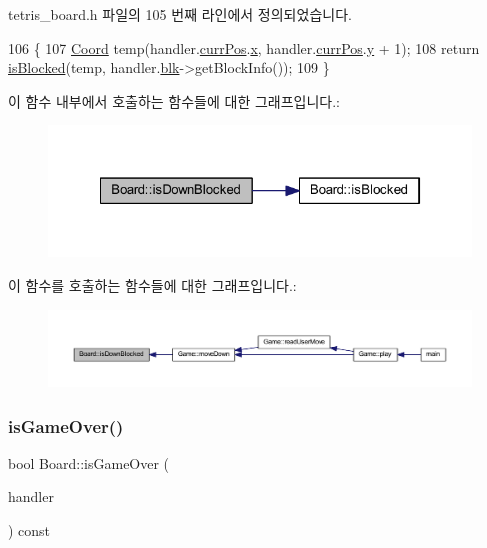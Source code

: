 tetris\+\_\+board.\+h 파일의 105 번째 라인에서 정의되었습니다.


\begin{DoxyCode}
106     \{
107         \mbox{\hyperlink{struct_coord}{Coord}} temp(handler.\mbox{\hyperlink{class_block_handler_a11bd634fdc179446f9c6751e2394999e}{currPos}}.\mbox{\hyperlink{struct_coord_a696eaa744360fc791d0e3b331c549dbe}{x}}, handler.\mbox{\hyperlink{class_block_handler_a11bd634fdc179446f9c6751e2394999e}{currPos}}.\mbox{\hyperlink{struct_coord_a214166cca70cef7dda9201689c3e81ab}{y}} + 1);
108         \textcolor{keywordflow}{return} \mbox{\hyperlink{class_board_a61ff9b1284e5c3e1214a780361ed650b}{isBlocked}}(temp, handler.\mbox{\hyperlink{class_block_handler_ab57212ded2552ab5559d278c8538c454}{blk}}->getBlockInfo());
109     \}
\end{DoxyCode}
이 함수 내부에서 호출하는 함수들에 대한 그래프입니다.\+:
\nopagebreak
\begin{figure}[H]
\begin{center}
\leavevmode
\includegraphics[width=322pt]{class_board_ad617ae22e46d1a62ed33592b20e00b44_cgraph}
\end{center}
\end{figure}
이 함수를 호출하는 함수들에 대한 그래프입니다.\+:
\nopagebreak
\begin{figure}[H]
\begin{center}
\leavevmode
\includegraphics[width=350pt]{class_board_ad617ae22e46d1a62ed33592b20e00b44_icgraph}
\end{center}
\end{figure}
\mbox{\label{class_board_a538ca2c02fbccf3af07ed3c821d9a736}} 
\subsubsection{\texorpdfstring{is\+Game\+Over()}{isGameOver()}}
{\footnotesize\ttfamily bool Board\+::is\+Game\+Over (\begin{DoxyParamCaption}\item[{const \mbox{\hyperlink{class_block_handler}{Block\+Handler}} \&}]{handler }\end{DoxyParamCaption}) const\hspace{0.3cm}{\ttfamily [inline]}}



